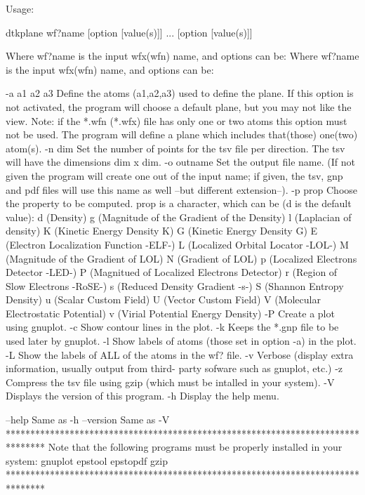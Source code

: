 Usage:

	dtkplane wf?name [option [value(s)]] ... [option [value(s)]]

Where wf?name is the input wfx(wfn) name, and options can be:
Where wf?name is the input wfx(wfn) name, and options can be:

  -a a1 a2 a3	Define the atoms  (a1,a2,a3) used to define the plane.
            	  If this option is not activated, the program will 
            	  choose a default plane, but you may not like the view.
            	  Note: if the *.wfn (*.wfx) file has only one or two atoms
            	  this option must not be used. The program will define
            	  a plane which includes that(those) one(two) atom(s).
  -n  dim   	Set the number of points for the tsv file per direction.
            	  The tsv will have the dimensions dim x dim.
  -o outname	Set the output file name.
            	  (If not given the program will create one out of
            	  the input name; if given, the tsv, gnp and pdf files will
            	  use this name as well --but different extension--).
  -p prop	Choose the property to be computed. prop is a character,
         	  which can be (d is the default value): 
         		d (Density)
         		g (Magnitude of the Gradient of the Density)
         		l (Laplacian of density)
         		K (Kinetic Energy Density K)
         		G (Kinetic Energy Density G)
         		E (Electron Localization Function -ELF-)
         		L (Localized Orbital Locator -LOL-)
         		M (Magnitude of the Gradient of LOL)
         		N (Gradient of LOL)
         		p (Localized Electrons Detector -LED-)
         		P (Magnitued of Localized Electrons Detector)
         		r (Region of Slow Electrons -RoSE-)
         		s (Reduced Density Gradient -s-)
         		S (Shannon Entropy Density)
         		u (Scalar Custom Field)
         		U (Vector Custom Field)
         		V (Molecular Electrostatic Potential)
         		v (Virial Potential Energy Density)
  -P     	Create a plot using gnuplot.
  -c     	Show contour lines in the plot.
  -k     	Keeps the *.gnp file to be used later by gnuplot.
  -l     	Show labels of atoms (those set in option -a) in the plot.
  -L     	Show the labels of ALL of the atoms in the wf? file.
  -v     	Verbose (display extra information, usually output from third-
         	  party sofware such as gnuplot, etc.)
  -z     	Compress the tsv file using gzip (which must be intalled
         	   in your system).
  -V        	Displays the version of this program.
  -h     	Display the help menu.

  --help    		Same as -h
  --version 		Same as -V
********************************************************************************
  Note that the following programs must be properly installed in your system:
                                    gnuplot
                                    epstool
                                    epstopdf
                                      gzip
********************************************************************************
